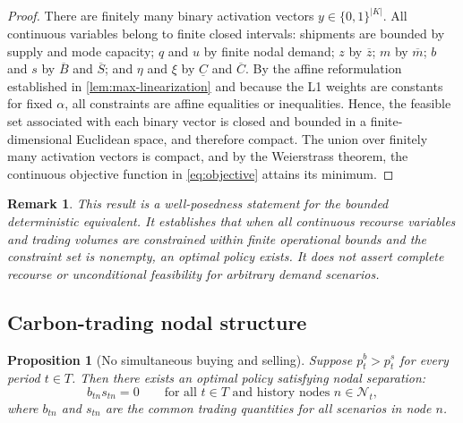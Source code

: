 \documentclass[11pt,a4paper]{article}
\newtheorem{proposition}{Proposition}
\newtheorem{remark}{Remark}
\begin{document}
\begin{proof}
There are finitely many binary activation vectors
\(y\in\{0,1\}^{|K|}\). All continuous variables belong to finite closed
intervals: shipments are bounded by supply and mode capacity;
\(q\) and \(u\) by finite nodal demand; \(z\) by \(\overline{z}\);
\(m\) by \(\overline{m}\); \(b\) and \(s\) by \(\overline{B}\) and
\(\overline{S}\); and \(\eta\) and \(\xi\) by \(\underline{C}\) and
\(\overline{C}\). By the affine reformulation established in
\cref{lem:max-linearization} and because the L1 weights are constants
for fixed \(\alpha\), all constraints are affine equalities or
inequalities. Hence, the
feasible set associated with each binary vector is closed and bounded in
a finite-dimensional Euclidean space, and therefore compact. The union
over finitely many activation vectors is compact, and by the Weierstrass
theorem, the continuous objective function in \cref{eq:objective}
attains its minimum.
\end{proof}

\begin{remark}
This result is a well-posedness statement for the bounded deterministic
equivalent. It establishes that when all continuous recourse variables
and trading volumes are constrained within finite operational bounds and
the constraint set is nonempty, an optimal policy exists. It does not
assert complete recourse or unconditional feasibility for arbitrary
demand scenarios.
\end{remark}

\subsection{Carbon-trading nodal structure}

\begin{proposition}[No simultaneous buying and selling]
\label{prop:no-simul-trading}
Suppose \(p_t^b>p_t^s\) for every period \(t\in T\). Then there exists
an optimal policy satisfying nodal separation:
\begin{equation}
  b_{tn}s_{tn}=0
  \qquad
  \text{for all }t\in T\text{ and history nodes }n\in\mathcal{N}_t,
  \label{eq:no-simultaneous-trading}
\end{equation}
where \(b_{tn}\) and \(s_{tn}\) are the common trading quantities for
all scenarios in node \(n\).
\end{proposition}
\end{document}
